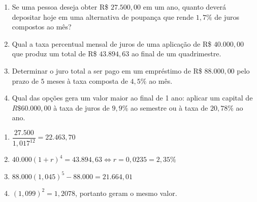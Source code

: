 \documentclass[10 pt,usenames,dvipsnames, oneside]{article}
\begin{document}
\begin{enumerate}

\item{}
Se uma pessoa deseja obter R\$ $27.500{,}00$ em um ano, quanto deverá depositar hoje em uma alternativa de poupança que rende $1{,}7\%$ de juros compostos ao mês?

\item{}
Qual a taxa percentual mensal de juros de uma aplicação de R\$ $40.000{,}00$ que produz um total de R\$ $43.894{,}63$ ao final de um quadrimestre.

\item{}
Determinar o juro total a ser pago em um empréstimo de R\$ $88.000{,}00$ pelo prazo de $5$ meses à taxa composta de $4{,}5\%$ ao mês.

\item{}
Qual das opções gera um valor maior ao final de 1 ano: aplicar um capital de $R\$60.000{,}00$ à taxa de juros de $9{,}9\%$ ao semestre ou à taxa de $20{,}78\%$ ao ano.

\end{enumerate}

\ifdefined\prof
\begin{solucao}

\begin{enumerate}

\item{}
$\dfrac{27.500}{1{,}017^{12}}=22.463{,}70$

\item{}
$40.000(1+r)^4=43.894{,}63 \iff r=0,0235=2{,}35\%$

\item
$88.000(1{,}045)^5-88.000=21.664{,}01$

\item
$(1{,}099)^2=1{,}2078$, portanto geram o mesmo valor.

\end{enumerate}

\end{solucao}
\fi
\end{document}
